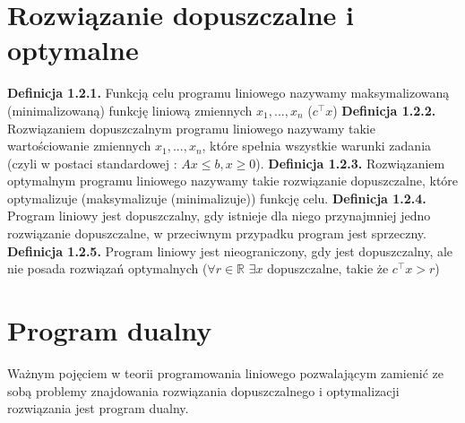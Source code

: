 \documentclass[licencjacka]{pracamgr}
\begin{document}
  \section{Rozwiązanie dopuszczalne i optymalne}
\textbf{Definicja 1.2.1.} Funkcją celu programu liniowego nazywamy maksymalizowaną (minimalizowaną) funkcję liniową zmiennych $x_1,...,x_n$ ($c^{\top}x$)\newline\newline
%
\textbf{Definicja 1.2.2.} Rozwiązaniem dopuszczalnym programu liniowego nazywamy takie wartościowanie zmiennych $x_1,...,x_n$, które spełnia wszystkie warunki zadania
(czyli w postaci standardowej : $Ax\le b,x\ge0$).\newline\newline
%
\textbf{Definicja 1.2.3.} Rozwiązaniem optymalnym programu liniowego nazywamy takie rozwiązanie dopuszczalne, które optymalizuje (maksymalizuje (minimalizuje)) funkcję celu.\newline\newline
%
\textbf{Definicja 1.2.4.} Program liniowy jest dopuszczalny, gdy istnieje dla niego przynajmniej jedno rozwiązanie dopuszczalne, w przeciwnym przypadku program jest sprzeczny.\newline\newline
%
\textbf{Definicja 1.2.5.} Program liniowy jest nieograniczony, gdy jest dopuszczalny, ale nie posada rozwiązań optymalnych ($\forall r\in \mathbb{R}$ $\exists x$ dopuszczalne, takie że $c^{\top}x>r$)
%
  \section{Program dualny}
Ważnym pojęciem w teorii programowania liniowego pozwalającym zamienić ze sobą problemy znajdowania rozwiązania dopuszczalnego i optymalizacji rozwiązania jest program dualny.\newline
\end{document}
